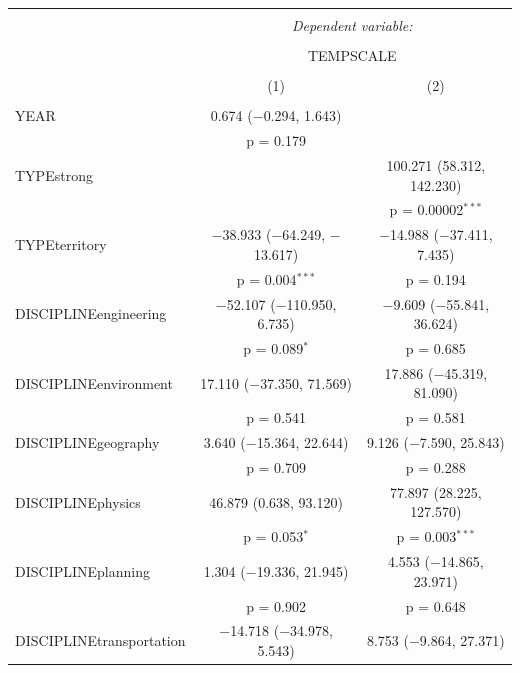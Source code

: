 
\begin{table}[!htbp] \centering 
  \appcaption{}{}
\begin{tabular}{@{\extracolsep{5pt}}lcc} 
\\[-1.8ex]\hline 
\hline \\[-1.8ex] 
 & \multicolumn{2}{c}{\textit{Dependent variable:}} \\ 
\cline{2-3} 
\\[-1.8ex] & \multicolumn{2}{c}{TEMPSCALE} \\ 
\\[-1.8ex] & (1) & (2)\\ 
\hline \\[-1.8ex] 
 YEAR & 0.674 ($-$0.294, 1.643) &  \\ 
  & p = 0.179 &  \\ 
  TYPEstrong &  & 100.271 (58.312, 142.230) \\ 
  &  & p = 0.00002$^{***}$ \\ 
  TYPEterritory & $-$38.933 ($-$64.249, $-$13.617) & $-$14.988 ($-$37.411, 7.435) \\ 
  & p = 0.004$^{***}$ & p = 0.194 \\ 
  DISCIPLINEengineering & $-$52.107 ($-$110.950, 6.735) & $-$9.609 ($-$55.841, 36.624) \\ 
  & p = 0.089$^{*}$ & p = 0.685 \\ 
  DISCIPLINEenvironment & 17.110 ($-$37.350, 71.569) & 17.886 ($-$45.319, 81.090) \\ 
  & p = 0.541 & p = 0.581 \\ 
  DISCIPLINEgeography & 3.640 ($-$15.364, 22.644) & 9.126 ($-$7.590, 25.843) \\ 
  & p = 0.709 & p = 0.288 \\ 
  DISCIPLINEphysics & 46.879 (0.638, 93.120) & 77.897 (28.225, 127.570) \\ 
  & p = 0.053$^{*}$ & p = 0.003$^{***}$ \\ 
  DISCIPLINEplanning & 1.304 ($-$19.336, 21.945) & 4.553 ($-$14.865, 23.971) \\ 
  & p = 0.902 & p = 0.648 \\ 
  DISCIPLINEtransportation & $-$14.718 ($-$34.978, 5.543) & 8.753 ($-$9.864, 27.371) \\ 

\end{tabular}
\end{table}
